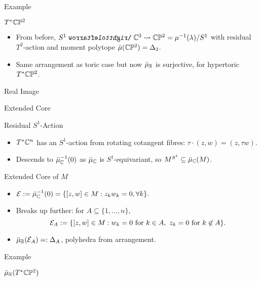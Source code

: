 \begin{frame}{Example}
    \begin{block}{$T^{\ast}\mathbb{C}\mathbb{P}^{2}$}
        \begin{itemize}
            \item From before, $S^{1} \acts \CC^{3} \rightsquigarrow \CC\PP^{2} = \mu^{-1}(\lambda) / S^{1}$ with residual $T^{2}$-action and moment polytope $\bar{\mu}(\mathbb{C}\mathbb{P}^{2}) = \Delta_{2}$.
            \item Same arrangement as toric case but now $\bar{\mu}_{\mathbb{R}}$ is surjective, for hypertoric $T^{\ast}\mathbb{C}\mathbb{P}^{2}$.
        \end{itemize}
    \end{block}
    \begin{block}{Real Image}
        \vspace{88pt}
    \end{block}
\end{frame}

\begin{frame}{Extended Core}
    \begin{block}{Residual $S^{1}$-Action}
        \begin{itemize}
            \item $T^{\ast}\mathbb{C}^{n}$ has an $S^{1}$-action from rotating cotangent fibres: $\tau\cdot (z,w) = (z,\tau w)$.
            \item Descends to $\bar{\mu}_{\mathbb{C}}^{-1}(0)$ as $\bar{\mu}_{\mathbb{C}}$ is $S^{1}$-equivariant, so $M^{S^{1}} \subseteq \bar{\mu}_{\mathbb{C}}(M)$.
        \end{itemize}
    \end{block}
    \begin{block}{Extended Core of $M$}
        \begin{itemize}
            \item $\mathcal{E} := \bar{\mu}_{\mathbb{C}}^{-1}(0) = \{ [z,w] \in M : z_{k}w_{k} = 0, \forall k \}. $
            \item Breaks up further: for $A \subseteq \{ 1, \ldots, n \}$,
            $$ \mathcal{E}_{A} := \{ [z,w] \in M : w_{k} = 0 \text{ for } k \in A,\ z_{k} = 0 \text{ for } k \not\in A \}. $$
            \item $\bar{\mu}_{\mathbb{R}}(\mathcal{E}_{A}) =: \Delta_{A}$, polyhedra from arrangement.
        \end{itemize}
    \end{block}
\end{frame}

\begin{frame}{Example}
    \begin{block}{$\bar{\mu}_{\mathbb{R}}(T^{\ast}\mathbb{C}\mathbb{P}^{2})$}
        \vspace{192pt}
    \end{block}
\end{frame}
